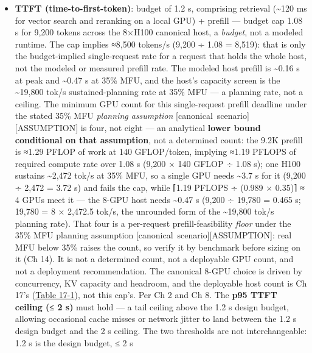 \begin{itemize}
\tightlist
\item
  \textbf{TTFT (time-to-first-token)}: budget of 1.2 s, comprising
  retrieval (\textasciitilde120 ms for vector search and reranking on a
  local GPU) + prefill --- budget cap 1.08 s for 9,200 tokens across the
  8×H100 canonical host, a \emph{budget}, not a modeled runtime. The cap
  implies ≈8,500 tokens/s (9,200 ÷ 1.08 = 8,519): that is only the
  budget-implied single-request rate for a request that holds the whole
  host, not the modeled or measured prefill rate. The modeled host
  prefill is \textasciitilde0.16 s at peak and \textasciitilde0.47 s at
  35\% MFU, and the host's capacity screen is the \textasciitilde19,800
  tok/s sustained-planning rate at 35\% MFU --- a planning rate, not a
  ceiling. The minimum GPU count for this single-request prefill
  deadline under the stated 35\% MFU \emph{planning assumption}
  \mbox{{[}canonical scenario{]}}\hspace{0pt}\mbox{{[}ASSUMPTION{]}} is four, not eight --- an
  analytical \textbf{lower bound conditional on that assumption}, not a
  determined count: the 9.2K prefill is ≈1.29 PFLOP of work at 140
  GFLOP/token, implying ≈1.19 PFLOPS of required compute rate over 1.08
  s (9,200 × 140 GFLOP ÷ 1.08 s); one H100 sustains \textasciitilde2,472
  tok/s at 35\% MFU, so a single GPU needs \textasciitilde3.7 s for it
  (9,200 ÷ 2,472 = 3.72 s) and fails the cap, while ⌈1.19 PFLOPS ÷
  (0.989 × 0.35)⌉ ≈ 4 GPUs meet it --- the 8-GPU host needs
  \textasciitilde0.47 s (9,200 ÷ 19,780 = 0.465 s; 19,780 = 8 × 2,472.5
  tok/s, the unrounded form of the \textasciitilde19,800 tok/s planning
  rate). That four is a per-request prefill-feasibility \emph{floor}
  under the 35\% MFU planning assumption \mbox{{[}canonical
  scenario{]}}\hspace{0pt}\mbox{{[}ASSUMPTION{]}}: real MFU below 35\% raises the count, so
  verify it by benchmark before sizing on it (Ch 14). It is not a
  determined count, not a deployable GPU count, and not a deployment
  recommendation. The canonical 8-GPU choice is driven by concurrency,
  KV capacity and headroom, and the deployable host count is Ch 17's
  (\hyperref[tab:17.1]{Table 17-1}), not this cap's. Per Ch 2 and Ch 8. The \textbf{p95 TTFT
  ceiling (≤ 2 s)} must hold --- a tail ceiling above the 1.2 s design
  budget, allowing occasional cache misses or network jitter to land
  between the 1.2 s design budget and the 2 s ceiling. The two
  thresholds are not interchangeable: 1.2 s is the design budget, ≤ 2 s

\end{itemize}
